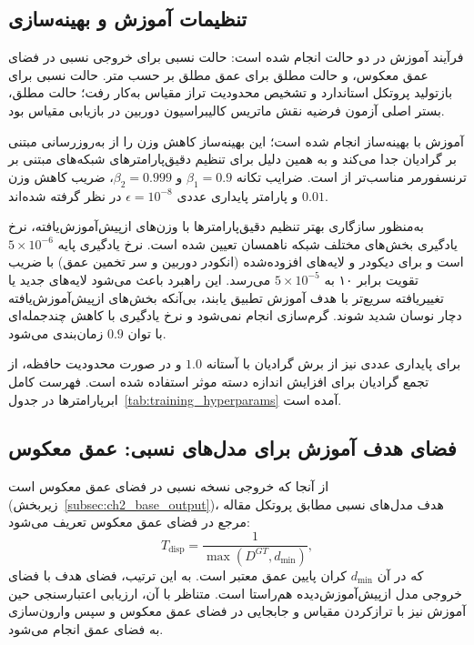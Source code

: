 \subsection{تنظیمات آموزش و بهینه‌سازی}

فرآیند آموزش  در دو حالت انجام شده است: حالت نسبی برای خروجی نسبی در فضای عمق معکوس، و حالت مطلق برای عمق مطلق بر حسب متر. حالت نسبی برای بازتولید پروتکل استاندارد و تشخیص محدودیت تراز مقیاس به‌کار رفت؛ حالت مطلق، بستر اصلی آزمون فرضیه نقش ماتریس کالیبراسیون دوربین در بازیابی مقیاس بود.

آموزش با بهینه‌ساز  \cite{Loshchilov2019AdamW} انجام شده است؛ این بهینه‌ساز کاهش وزن را از به‌روزرسانی مبتنی بر گرادیان جدا می‌کند و به همین دلیل برای تنظیم دقیق‌پارامترهای شبکه‌های مبتنی بر ترنسفورمر مناسب‌تر از  است. ضرایب تکانه $\beta_1=0.9$ و $\beta_2=0.999$، ضریب کاهش وزن $0.01$ و پارامتر پایداری عددی $\epsilon=10^{-8}$ در نظر گرفته شده‌اند.

به‌منظور سازگاری بهتر تنظیم دقیق‌پارامترها با وزن‌های ازپیش‌آموزش‌یافته، نرخ یادگیری بخش‌های مختلف شبکه ناهمسان تعیین شده است. نرخ یادگیری پایه $5\times10^{-6}$ است و برای دیکودر و لایه‌های افزوده‌شده (انکودر دوربین و سر تخمین عمق) با ضریب تقویت  برابر ۱۰ به $5\times10^{-5}$ می‌رسد. این راهبرد باعث می‌شود لایه‌های جدید یا تغییریافته سریع‌تر با هدف آموزش تطبیق یابند، بی‌آنکه بخش‌های ازپیش‌آموزش‌یافته دچار نوسان شدید شوند. گرم‌سازی انجام نمی‌شود و نرخ یادگیری با کاهش چندجمله‌ای با توان {$0.9$} زمان‌بندی می‌شود.

برای پایداری عددی نیز از برش گرادیان با آستانه $1.0$ و در صورت محدودیت حافظه، از تجمع گرادیان برای افزایش اندازه دسته موثر استفاده شده است. فهرست کامل ابرپارامترها در جدول~\ref{tab:training_hyperparams} آمده است.

\subsection{فضای هدف آموزش برای مدل‌های نسبی: عمق معکوس}
\label{subsec:disparity_target_space}

از آنجا که خروجی نسخه نسبی {\basemodel{}} در فضای عمق معکوس است (زیربخش~{\ref{subsec:ch2_base_output}})، هدف مدل‌های نسبی مطابق پروتکل مقاله مرجع در فضای عمق معکوس تعریف می‌شود:
\begin{equation}
T_{\mathrm{disp}} = \frac{1}{\max(D^{GT}, d_{\min})},
\end{equation}
که در آن $d_{\min}$ کران پایین عمق معتبر است. به این ترتیب، فضای هدف با فضای خروجی مدل ازپیش‌آموزش‌دیده هم‌راستا است. متناظر با آن، ارزیابی اعتبارسنجی حین آموزش نیز با ترازکردن مقیاس و جابجایی در فضای عمق معکوس و سپس وارون‌سازی به فضای عمق انجام می‌شود.

